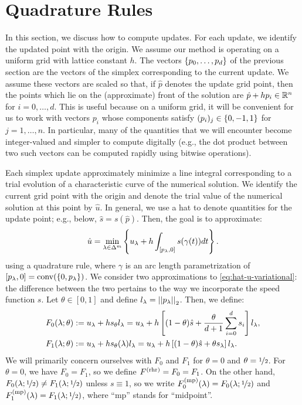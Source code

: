 \documentclass[eikonal.tex]{subfiles}
\begin{document}
\section{Quadrature Rules}

In this section, we discuss how to compute updates. For each update,
we identify the updated point with the origin. We assume our method is
operating on a uniform grid with lattice constant $h$. The vectors
$\left\{p_0, \hdots, p_d\right\}$ of the previous section are the vectors of
the simplex corresponding to the current update. We assume these
vectors are scaled so that, if $\hat{p}$ denotes the update grid
point, then the points which lie on the (approximate) front of the
solution are $\hat{p} + h p_i \in \mathbb{R}^n$ for $i = 0, \hdots, d$. This
is useful because on a uniform grid, it will be convenient for us to
work with vectors $p_i$ whose components satisfy
$(p_i)_j \in \left\{0, -1, 1\right\}$ for $j = 1, \hdots, n$. In particular,
many of the quantities that we will encounter become integer-valued
and simpler to compute digitally (e.g., the dot product between two
such vectors can be computed rapidly using bitwise operations).

Each simplex update approximately minimize a line integral
corresponding to a trial evolution of a characteristic curve of the
numerical solution. We identify the current grid point with the origin
and denote the trial value of the numerical solution at this point by
$\hat{u}$. In general, we use a hat to denote quantities for the
update point; e.g., below, $\hat{s} = s(\hat{p})$. Then, the goal is to
approximate:
\begin{align}\label{eq:hat-u-variational}
  \hat{u} = \min_{\lambda \in \Delta^m} \left\{u_\lambda + h \int_{[p_\lambda, 0]} s(\gamma(t))dt\right\}.
\end{align}
using a quadrature rule, where $\gamma$ is an arc length
parametrization of
$[p_\lambda, 0] = \operatorname{conv}(\left\{0, p_\lambda\right\})$. We
consider two approximations to \cref{eq:hat-u-variational}: the
difference between the two pertains to the way we incorporate the
speed function $s$. Let $\theta \in [0, 1]$ and define
$l_\lambda = \left|\left|p_\lambda\right|\right|_2$. Then, we define:
\begin{align*}
  F_0(\lambda; \theta) &:= u_\lambda + h s_\theta l_\lambda = u_\lambda + h \left[(1-\theta)\hat{s} + \frac{\theta}{d + 1} \sum_{i=0}^d s_i\right] l_\lambda, \\
  F_1(\lambda; \theta) &:= u_\lambda + h s_\theta(\lambda) l_\lambda = u_\lambda + h \left[(1-\theta)\hat{s} + \theta s_\lambda\right] l_\lambda.
\end{align*}
We will primarily concern ourselves with $F_0$ and $F_1$ for
$\theta = 0$ and $\theta = \nicefrac{1}{2}$. For $\theta = 0$, we have
$F_0 = F_1$, so we define $F^{\operatorname{(rhr)}} = F_0 = F_1$. On the other hand,
$F_0(\lambda;\nicefrac{1}{2}) \neq F_1(\lambda;\nicefrac{1}{2})$
unless $s \equiv 1$, so we write
$F_0^{\operatorname{(mp)}}(\lambda) = F_0(\lambda; \nicefrac{1}{2})$ and
$F_1^{\operatorname{(mp)}}(\lambda) = F_1(\lambda; \nicefrac{1}{2})$, where ``mp''
stands for ``midpoint''.
\end{document}
